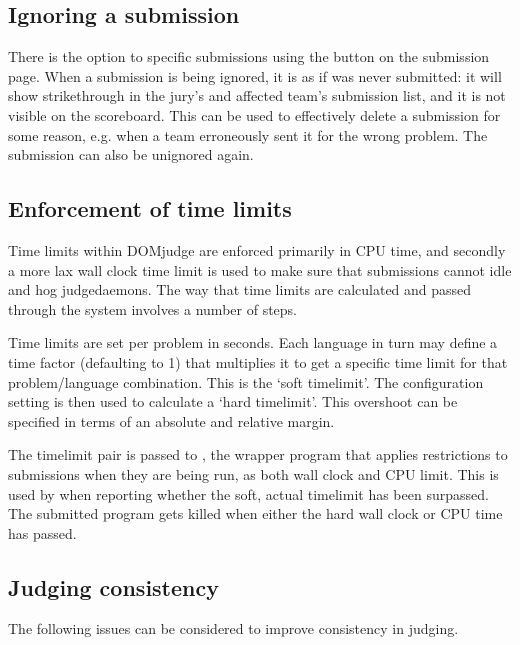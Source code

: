 \documentclass[a4paper,10pt,english,openany]{sphinxmanual}
\begin{document}
\subsection{Ignoring a submission}
\label{\detokenize{judging:ignoring-a-submission}}
\sphinxAtStartPar
There is the option to  specific submissions
using the button on the submission page. When a submission is being
ignored, it is as if was never submitted: it will show strike\sphinxhyphen{}through
in the jury’s and affected team’s submission list, and it is not
visible on the scoreboard. This can be used to effectively
delete a submission for some reason, e.g. when a team erroneously sent
it for the wrong problem. The submission can also be unignored again.


\subsection{Enforcement of time limits}
\label{\detokenize{judging:enforcement-of-time-limits}}
\sphinxAtStartPar
Time limits within DOMjudge are enforced primarily in CPU time, and
secondly a more lax wall clock time limit is used to make sure that
submissions cannot idle and hog judgedaemons. The way that time limits
are calculated and passed through the system involves a number of
steps.

\sphinxAtStartPar
Time limits are set per problem in seconds. Each language in turn may
define a time factor (defaulting to 1) that multiplies it to get a
specific time limit for that problem/language combination. This is
the ‘soft timelimit’. The configuration setting  is then used to calculate a ‘hard timelimit’.
This overshoot can be specified in terms of an absolute and relative
margin.

\sphinxAtStartPar
The  timelimit pair is passed to , the wrapper
program that applies restrictions to submissions when they are being
run, as both wall clock and CPU limit. This is used by  when
reporting whether the soft, actual timelimit has been surpassed. The
submitted program gets killed when either the hard wall clock or CPU
time has passed.


\subsection{Judging consistency}
\label{\detokenize{judging:judging-consistency}}\label{\detokenize{judging:id2}}
\sphinxAtStartPar
The following issues can be considered to improve consistency in
judging.
\end{document}
